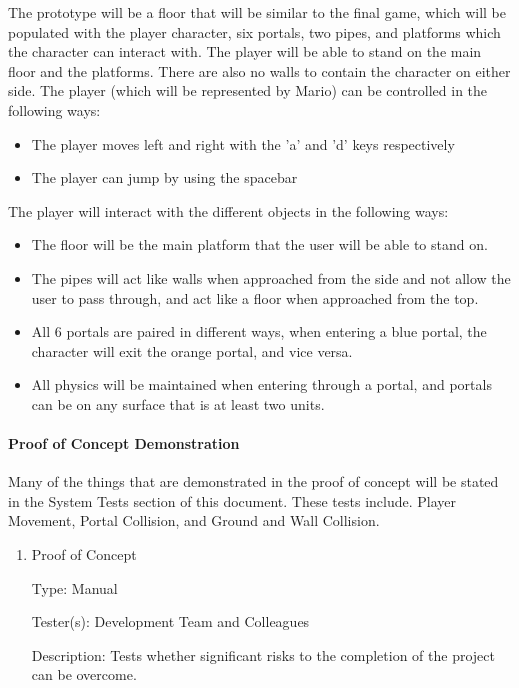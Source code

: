 \documentclass[12pt, titlepage]{article}
\begin{document}
The prototype will be a floor that will be similar to the final game, which will be populated with the player character, six portals, two pipes, and platforms which the character can interact with. The player will be able to stand on the main floor and the platforms. There are also no walls to contain the character on either side.
The player (which will be represented by Mario) can be controlled in the following ways:
\begin{itemize}  
\item The player moves left and right with the 'a' and 'd' keys respectively
\item The player can jump by using the spacebar
\end{itemize}


The player will interact with the different objects in the following ways:
\begin{itemize}  
\item The floor will be the main platform that the user will be able to stand on.
\item The pipes will act like walls when approached from the side and not allow the user to pass through, and act like a floor when approached from the top.
\item All 6 portals are paired in different ways, when entering a blue portal, the character will exit the orange portal, and vice versa.
\item All physics will be maintained when entering through a portal, and portals can be on any surface that is at least two units.
\end{itemize}


\paragraph{Proof of Concept Demonstration}
Many of the things that are demonstrated in the proof of concept will be stated in the System Tests section of this document. These tests include. Player Movement, Portal Collision, and Ground and Wall Collision.
\begin{enumerate}

\item{Proof of Concept}

Type: Manual

Tester(s): Development Team and Colleagues

Description: Tests whether significant risks to the completion of the project can be overcome.

\end{enumerate}
	
\end{document}
